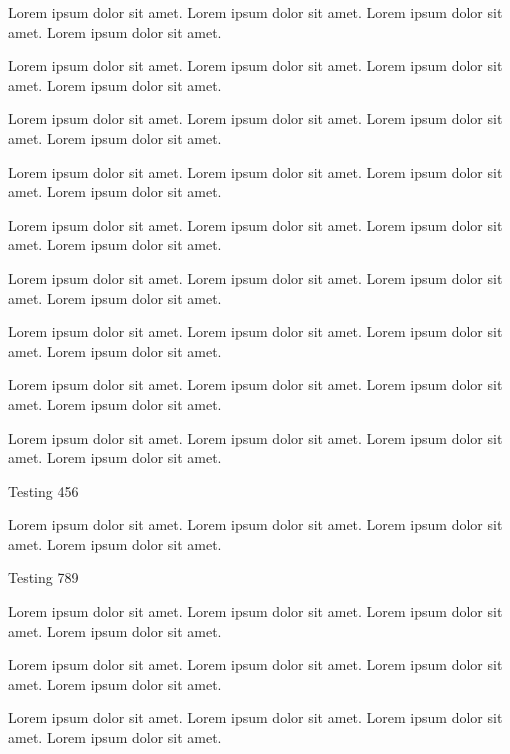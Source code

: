 Lorem ipsum dolor sit amet. Lorem ipsum dolor sit amet.
Lorem ipsum dolor sit amet. Lorem ipsum dolor sit amet.

\inlempty

Lorem ipsum dolor sit amet. Lorem ipsum dolor sit amet.
Lorem ipsum dolor sit amet. Lorem ipsum dolor sit amet.


Lorem ipsum dolor sit amet. Lorem ipsum dolor sit amet.
Lorem ipsum dolor sit amet. Lorem ipsum dolor sit amet.


Lorem ipsum dolor sit amet. Lorem ipsum dolor sit amet.
Lorem ipsum dolor sit amet. Lorem ipsum dolor sit amet.


Lorem ipsum dolor sit amet. Lorem ipsum dolor sit amet.
Lorem ipsum dolor sit amet. Lorem ipsum dolor sit amet.


Lorem ipsum dolor sit amet. Lorem ipsum dolor sit amet.
Lorem ipsum dolor sit amet. Lorem ipsum dolor sit amet.


Lorem ipsum dolor sit amet. Lorem ipsum dolor sit amet.
Lorem ipsum dolor sit amet. Lorem ipsum dolor sit amet.

\blkempty

Lorem ipsum dolor sit amet. Lorem ipsum dolor sit amet.
Lorem ipsum dolor sit amet. Lorem ipsum dolor sit amet.


Lorem ipsum dolor sit amet. Lorem ipsum dolor sit amet.
Lorem ipsum dolor sit amet. Lorem ipsum dolor sit amet.

\begin{blklit}
Testing 456
\end{blklit}

Lorem ipsum dolor sit amet. Lorem ipsum dolor sit amet.
Lorem ipsum dolor sit amet. Lorem ipsum dolor sit amet.

\begin{blkfrag}
Testing 789
\end{blkfrag}

Lorem ipsum dolor sit amet. Lorem ipsum dolor sit amet.
Lorem ipsum dolor sit amet. Lorem ipsum dolor sit amet.


Lorem ipsum dolor sit amet. Lorem ipsum dolor sit amet.
Lorem ipsum dolor sit amet. Lorem ipsum dolor sit amet.


Lorem ipsum dolor sit amet. Lorem ipsum dolor sit amet.
Lorem ipsum dolor sit amet. Lorem ipsum dolor sit amet.

